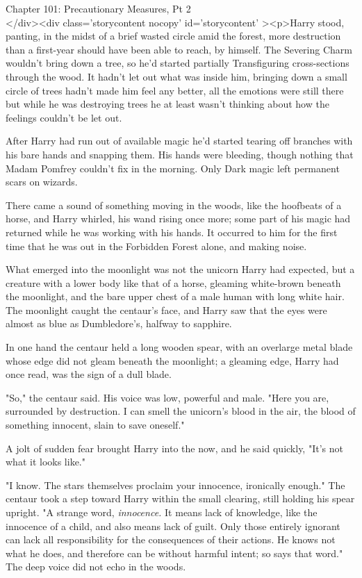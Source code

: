 
Chapter 101: Precautionary Measures, Pt 2\\
</div><div  class='storycontent nocopy' id='storycontent' ><p>Harry stood, 
panting, in the midst of a brief wasted circle amid the forest, more 
destruction than a first-year should have been able to reach, by himself. The 
Severing Charm wouldn't bring down a tree, so he'd started partially 
Transfiguring cross-sections through the wood. It hadn't let out what was 
inside him, bringing down a small circle of trees hadn't made him feel any 
better, all the emotions were still there but while he was destroying trees he 
at least wasn't thinking about how the feelings couldn't be let out.

After Harry had run out of available magic he'd started tearing off branches 
with his bare hands and snapping them. His hands were bleeding, though nothing 
that Madam Pomfrey couldn't fix in the morning. Only Dark magic left permanent 
scars on wizards.

There came a sound of something moving in the woods, like the hoofbeats of a 
horse, and Harry whirled, his wand rising once more; some part of his magic had 
returned while he was working with his hands. It occurred to him for the first 
time that he was out in the Forbidden Forest alone, and making noise.

What emerged into the moonlight was not the unicorn Harry had expected, but a 
creature with a lower body like that of a horse, gleaming white-brown beneath 
the moonlight, and the bare upper chest of a male human with long white hair. 
The moonlight caught the centaur's face, and Harry saw that the eyes were 
almost as blue as Dumbledore's, halfway to sapphire.

In one hand the centaur held a long wooden spear, with an overlarge metal blade 
whose edge did not gleam beneath the moonlight; a gleaming edge, Harry had once 
read, was the sign of a dull blade.

"So," the centaur said. His voice was low, powerful and male. "Here you are, 
surrounded by destruction. I can smell the unicorn's blood in the air, the 
blood of something innocent, slain to save oneself."

A jolt of sudden fear brought Harry into the now, and he said quickly, "It's 
not what it looks like."

"I know. The stars themselves proclaim your innocence, ironically enough." The 
centaur took a step toward Harry within the small clearing, still holding his 
spear upright. "A strange word, \emph{innocence.} It means lack of knowledge, 
like the innocence of a child, and also means lack of guilt. Only those 
entirely ignorant can lack all responsibility for the consequences of their 
actions. He knows not what he does, and therefore can be without harmful 
intent; so says that word." The deep voice did not echo in the woods.

